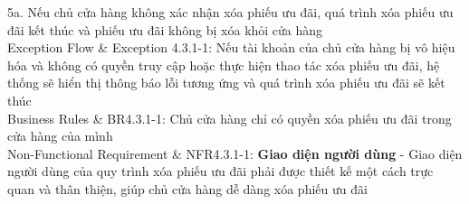 \begin{usecase_table}
                    5a. Nếu chủ cửa hàng không xác nhận xóa phiếu ưu đãi, quá trình xóa phiếu ưu đãi kết thúc và phiếu ưu đãi không bị xóa khỏi cửa hàng\\
                    \hline
                    Exception Flow & Exception 4.3.1-1: Nếu tài khoản của chủ cửa hàng bị vô hiệu hóa và không có quyền truy cập hoặc thực hiện thao tác xóa phiếu ưu đãi, hệ thống sẽ hiển thị thông báo lỗi tương ứng và quá trình xóa phiếu ưu đãi sẽ kết thúc\\
                    \hline
                    Business Rules	& BR4.3.1-1: Chủ cửa hàng chỉ có quyền xóa phiếu ưu đãi trong cửa hàng của mình\\
                    \hline
                    Non-Functional Requirement & NFR4.3.1-1: \textbf{Giao diện người dùng} - Giao diện người dùng của quy trình xóa phiếu ưu đãi phải được thiết kế một cách trực quan và thân thiện, giúp chủ cửa hàng dễ dàng xóa phiếu ưu đãi
                    \\
                    \hline
                \end{usecase_table}
